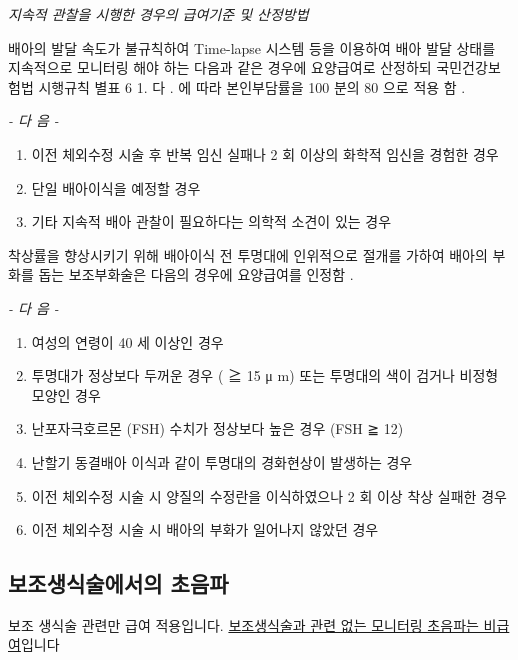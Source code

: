 \emph{지속적 관찰을 시행한 경우의 급여기준 및 산정방법} \par
배아의 발달 속도가 불규칙하여  Time-lapse  시스템 등을 이용하여 배아 발달 상태를 지속적으로 모니터링 해야 하는 다음과  같은 경우에 요양급여로 산정하되 국민건강보험법 시행규칙 별표 6 1. 다 . 에  따라 본인부담률을  100 분의  80 으로 적용 함 . \par
\emph{-  다 음  -}\par 
\begin{enumerate}[가.]\tightlist
\item 이전 체외수정 시술 후 반복 임신 실패나  2 회 이상의 화학적  임신을 경험한 경우 
\item 단일 배아이식을 예정할 경우 
\item 기타 지속적 배아 관찰이 필요하다는 의학적 소견이 있는 경우 
\end{enumerate} 

\par 
착상률을 향상시키기 위해 배아이식 전 투명대에 인위적으로  절개를 가하여 배아의 부화를 돕는 보조부화술은  다음의 경우에 요양급여를 인정함 . \par
\emph{-  다 음  -}\par  
\begin{enumerate}[가.]\tightlist
\item 여성의 연령이  40 세 이상인 경우 
\item 투명대가 정상보다 두꺼운 경우 ( ≧ 15 μ m)  또는 투명대의 색이 검거나 비정형 모양인 경우 
\item 난포자극호르몬 (FSH)  수치가 정상보다 높은 경우 (FSH ≧ 12) 
\item 난할기 동결배아 이식과 같이 투명대의 경화현상이 발생하는 경우 
\item 이전 체외수정 시술 시 양질의 수정란을 이식하였으나  2 회  이상 착상 실패한 경우 
\item 이전 체외수정 시술 시 배아의 부화가 일어나지 않았던 경우
\end{enumerate} 

\subsection{보조생식술에서의 초음파}
보조 생식술 관련만 급여 적용입니다. \uline{보조생식술과 관련 없는 모니터링 초음파는 비급여}입니다


